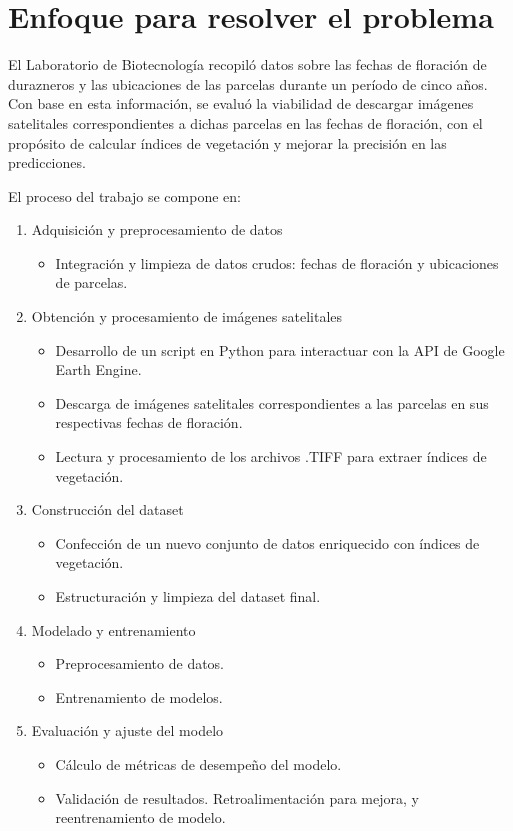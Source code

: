 \section{Enfoque para resolver el problema}

El Laboratorio de Biotecnología recopiló datos sobre las fechas de floración de durazneros
y las ubicaciones de las parcelas durante un período de cinco años. Con base en esta 
información, se evaluó la viabilidad de descargar imágenes satelitales correspondientes
a dichas parcelas en las fechas de floración, con el propósito de calcular índices de
vegetación y mejorar la precisión en las predicciones.

El proceso del trabajo se compone en: 

\begin{enumerate}
  \item Adquisición y preprocesamiento de datos
      \begin{itemize}
        \item Integración y limpieza de datos crudos: fechas de floración y ubicaciones de parcelas.
      \end{itemize}
  \item Obtención y procesamiento de imágenes satelitales
      \begin{itemize}
        \item Desarrollo de un script en Python para interactuar con la API de Google Earth Engine.
        \item Descarga de imágenes satelitales correspondientes a las parcelas en sus respectivas fechas de floración.
        \item Lectura y procesamiento de los archivos .TIFF para extraer índices de vegetación.
      \end{itemize}
  \item Construcción del dataset
      \begin{itemize}
        \item Confección de un nuevo conjunto de datos enriquecido con índices de vegetación.
        \item Estructuración y limpieza del dataset final.
      \end{itemize}
  \item  Modelado y entrenamiento
      \begin{itemize}
        \item Preprocesamiento de datos.
        \item Entrenamiento de modelos.
      \end{itemize}
  \item Evaluación y ajuste del modelo
      \begin{itemize}
        \item Cálculo de métricas de desempeño del modelo.
        \item Validación de resultados. Retroalimentación para mejora, y reentrenamiento de modelo.
      \end{itemize}
	\end{enumerate}

